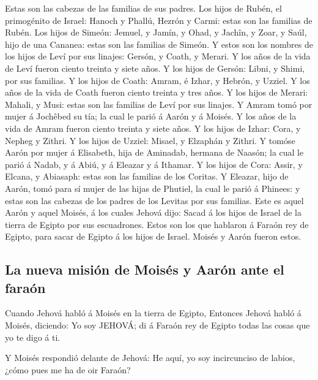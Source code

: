  Estas son las cabezas de las familias de sus padres. Los
hijos de Rubén, el primogénito de Israel: Hanoch y Phallú, Hezrón y
Carmi: estas son las familias de Rubén.  Los hijos de
Simeón: Jemuel, y Jamín, y Ohad, y Jachîn, y Zoar, y Saúl, hijo de una
Cananea: estas son las familias de Simeón.  Y estos son los
nombres de los hijos de Leví por sus linajes: Gersón, y Coath, y Merari.
Y los años de la vida de Leví fueron ciento treinta y siete años.
 Y los hijos de Gersón: Libni, y Shimi, por sus familias.
 Y los hijos de Coath: Amram, é Izhar, y Hebrón, y Uzziel.
Y los años de la vida de Coath fueron ciento treinta y tres años.
 Y los hijos de Merari: Mahali, y Musi: estas son las
familias de Leví por sus linajes.  Y Amram tomó por mujer á
Jochêbed su tía; la cual le parió á Aarón y á Moisés. Y los años de la
vida de Amram fueron ciento treinta y siete años.  Y los
hijos de Izhar: Cora, y Nepheg y Zithri.  Y los hijos de
Uzziel: Misael, y Elzaphán y Zithri.  Y tomóse Aarón por
mujer á Elisabeth, hija de Aminadab, hermana de Naasón; la cual le parió
á Nadab, y á Abiú, y á Eleazar y á Ithamar.  Y los hijos de
Cora: Assir, y Elcana, y Abiasaph: estas son las familias de los
Coritas.  Y Eleazar, hijo de Aarón, tomó para sí mujer de
las hijas de Phutiel, la cual le parió á Phinees: y estas son las
cabezas de los padres de los Levitas por sus familias. 
Este es aquel Aarón y aquel Moisés, á los cuales Jehová dijo: Sacad á
los hijos de Israel de la tierra de Egipto por sus escuadrones.
 Estos son los que hablaron á Faraón rey de Egipto, para
sacar de Egipto á los hijos de Israel. Moisés y Aarón fueron estos.

\hypertarget{la-nueva-misiuxf3n-de-moisuxe9s-y-aaruxf3n-ante-el-farauxf3n}{%
\subsection{La nueva misión de Moisés y Aarón ante el
faraón}\label{la-nueva-misiuxf3n-de-moisuxe9s-y-aaruxf3n-ante-el-farauxf3n}}

 Cuando Jehová habló á Moisés en la tierra de Egipto,
 Entonces Jehová habló á Moisés, diciendo: Yo soy JEHOVÁ;
di á Faraón rey de Egipto todas las cosas que yo te digo á ti.

 Y Moisés respondió delante de Jehová: He aquí, yo soy
incircunciso de labios, ¿cómo pues me ha de oir Faraón?

